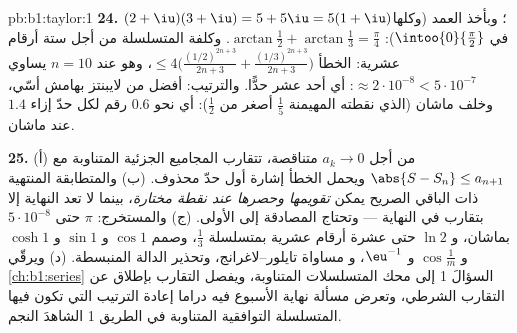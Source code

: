 \begin{solution}{pb:b1:taylor:1}
\textbf{24.} $(2+\iu)(3+\iu) = 5 + 5\iu = 5(1+\iu)$؛ وبأخذ
العمد (وكلها في $\intoo{0}{\frac\pi2}$): $\arctan\frac12 +
\arctan\frac13 = \frac\pi4$. وكلفة المتسلسلة من أجل ستة أرقام عشرية:
الخطأ $\leq 4\bigl(\frac{(1/2)^{2n+3}}{2n+3} +
\frac{(1/3)^{2n+3}}{2n+3}\bigr)$، وهو عند $n = 10$ يساوي
$\approx 2\cdot10^{-8} < 5\cdot10^{-7}$: أي أحد عشر حدًّا. والترتيب:
أفضل من لايبنتز بهامش أسّي، وخلف ماشان
(الذي نقطته المهيمنة $\frac15$ أصغر من $\frac12$):
أي نحو $0.6$ رقم لكل حدّ إزاء $1.4$ عند ماشان.

\textbf{25.} (أ) من أجل $a_k \to 0$ متناقصة، تتقارب المجاميع
الجزئية المتناوبة مع $\abs{S - S_n} \leq a_{n+1}$ ويحمل
الخطأ إشارة أول حدّ محذوف. (ب) والمتطابقة المنتهية
ذات الباقي الصريح يمكن \emph{تقويمها وحصرها
عند نقطة مختارة}، بينما لا تعد  النهاية إلا بتقارب
في النهاية --- وتحتاج المصادقة إلى الأولى.
(ج) والمستخرج: $\pi$ حتى $5\cdot10^{-8}$ بماشان، و $\ln 2$ حتى
عشرة أرقام عشرية بمتسلسلة $\frac13$، وصمم $\cos 1$ و
$\sin 1$ و $\cosh 1$ و $\cos\frac1m$ و $\eu^{-1}$، و
مساواة تايلور--لاغرانج، وتحذير الدالة المنبسطة. (د)
ويرقّي \cref{ch:b1:series} السؤالَ 1 إلى محك المتسلسلات
المتناوبة، ويفصل التقارب بإطلاق عن التقارب الشرطي،
وتعرض مسألة نهاية الأسبوع فيه دراما إعادة الترتيب التي
تكون فيها المتسلسلة التوافقية المتناوبة في الطريق 1 الشاهدَ
النجم.
\end{solution}
